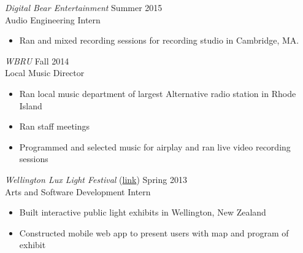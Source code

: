 {\sl Digital Bear Entertainment} \hfill
Summer 2015 \\
Audio Engineering Intern \\
\begin{itemize}
\item Ran and mixed recording sessions for recording studio in Cambridge, MA.
\end{itemize}

{\sl WBRU} \hfill
Fall 2014 \\
Local Music Director \\
\begin{itemize}
\item Ran local music department of largest Alternative radio station in Rhode Island
\item Ran staff meetings
\item Programmed and selected music for airplay and ran live video recording sessions 
\end{itemize}

{\sl Wellington Lux Light Festival}  (\href{https://www.facebook.com/LUXLightfestival/}{link}) \hfill Spring 2013 \\
Arts and Software Development Intern \\
\begin{itemize}
\item Built interactive public light exhibits in Wellington, New Zealand
\item Constructed mobile web app to present users with map and program of exhibit 
\end{itemize}